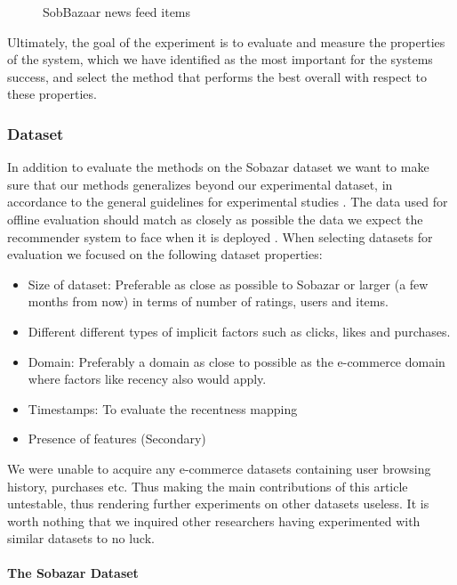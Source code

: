 \begin{figure}[H]
\begin{minipage}{.45\linewidth}
		\end{minipage}
		\caption[Sobazaar News Feed - Version 0.5.1]{SobBazaar news feed items}
		\label{figure:sobazarfeed}
\end{figure}

Ultimately, the goal of the experiment is to evaluate and measure the properties
of the system, which we have identified as the most important for the systems success,
and select the method that performs the best overall with respect to these properties.

\subsubsection{Dataset}

In addition to evaluate the methods on the Sobazar dataset we want to make sure that our
methods generalizes beyond our experimental dataset, in accordance to the general guidelines
for experimental studies \cite{Shani2011}. The data used for offline evaluation should match
as closely as possible the data we expect the recommender system to face when it is
deployed \cite{Gunawardana2009}. When selecting datasets for evaluation we focused on the
following dataset properties:

\begin{itemize}
	\item Size of dataset: Preferable as close as possible to Sobazar or larger (a few months from now)
	in terms of number of ratings, users and items.
	\item Different different types of implicit factors	such as clicks, likes and purchases.
	\item Domain: Preferably a domain as close to possible as the e-commerce domain where
	factors like recency also would apply.
	\item Timestamps: To evaluate the recentness mapping
	\item Presence of features (Secondary)
\end{itemize}

We were unable to acquire any e-commerce datasets containing user browsing history, purchases etc.
Thus making the main contributions of this article untestable, thus rendering further experiments
on other datasets useless. It is worth nothing that we inquired other researchers having
experimented with similar datasets to no luck.

\paragraph{The Sobazar Dataset}

